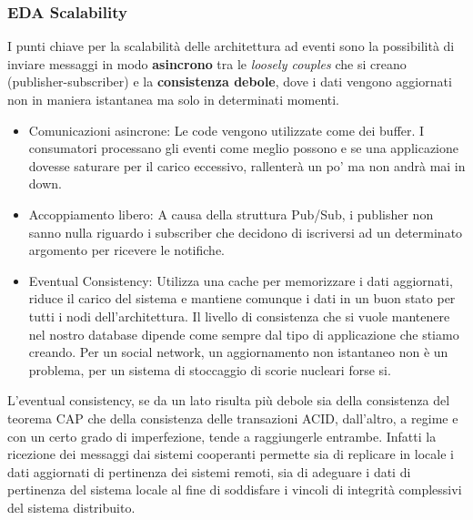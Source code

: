 \documentclass{article}
\begin{document}
		\subsubsection{EDA Scalability}
		I punti chiave per la scalabilità delle architettura ad eventi sono la possibilità di inviare messaggi in modo \textbf{asincrono} tra le \textit{loosely couples} che si creano (publisher-subscriber) e la \textbf{consistenza debole}, dove i dati vengono aggiornati non in maniera istantanea ma solo in determinati momenti.
		\begin{itemize}
		    \item Comunicazioni asincrone: Le code vengono utilizzate come dei buffer. I consumatori processano gli eventi come meglio possono e se una applicazione dovesse saturare per il carico eccessivo, rallenterà un po' ma non andrà mai in down.
		    \item Accoppiamento libero: A causa della struttura Pub/Sub, i publisher non sanno nulla riguardo i subscriber che decidono di iscriversi ad un determinato argomento per ricevere le notifiche.
		    \item Eventual Consistency: Utilizza una cache per memorizzare i dati aggiornati, riduce il carico del sistema e mantiene comunque i dati in un buon stato per tutti i nodi dell'architettura. 
		    Il livello di consistenza che si vuole mantenere nel nostro database dipende come sempre dal tipo di applicazione che stiamo creando.
		    Per un social network, un aggiornamento non istantaneo non è un problema, per un sistema di stoccaggio di scorie nucleari forse si. 
		\end{itemize}
		
		L’eventual consistency, se da un lato risulta più debole sia della consistenza del teorema CAP che della consistenza delle transazioni ACID, dall’altro, a regime e con un certo grado di imperfezione, tende a raggiungerle entrambe. Infatti la ricezione dei messaggi dai sistemi cooperanti permette sia di replicare in locale i dati aggiornati di pertinenza dei sistemi remoti, sia di adeguare i dati di pertinenza del sistema locale al fine di soddisfare i vincoli di integrità complessivi del sistema distribuito.
		
\end{document}
